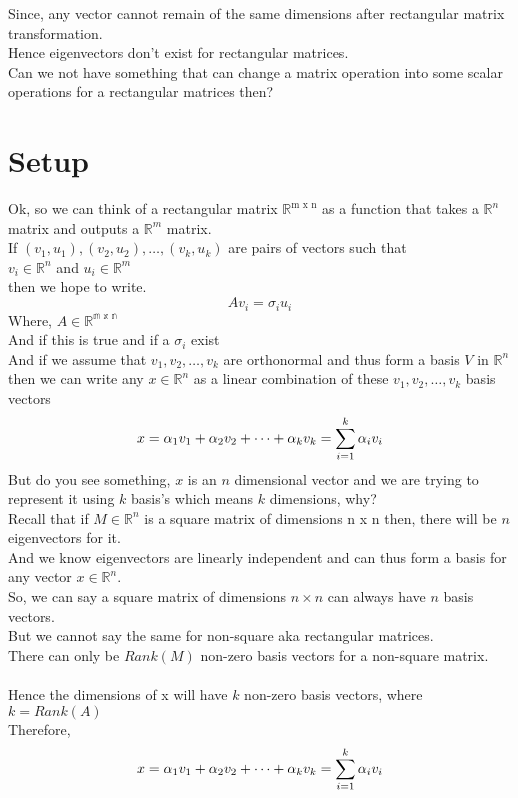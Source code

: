 \documentclass{article}
\begin{document}
Since, any vector cannot remain of the same dimensions after rectangular matrix transformation.\\
Hence eigenvectors don't exist for rectangular matrices.\\
Can we not have something that can change a matrix operation into some scalar operations for a rectangular matrices then?\\
\section{Setup}
Ok, so we can think of a rectangular matrix $\mathbb{R}^{\mbox{m x n}}$ as a function that takes a $\mathbb{R}^n$ matrix and outputs a $\mathbb{R}^m$ matrix.\\
If $(v_1,u_1),(v_2,u_2),\dots,(v_k,u_k)$ are pairs of vectors such that\\
$v_i\in \mathbb{R}^n$ and $u_i\in \mathbb{R}^m$\\ then we hope to write.\\
$$
  Av_i=\sigma_iu_i
$$
Where, $A \in \mathbb{R^{\mbox{m x n}}}$\\
And if this is true and if a $\sigma_i$ exist\\
And if we assume that $v_1,v_2,\dots,v_k$ are orthonormal and thus form a basis $V$ in $\mathbb{R}^n$ then we can write any $x\in\mathbb{R}^{n}$ as a linear combination of these $v_1,v_2,\dots,v_k$ basis vectors\\
$$
  x=\alpha_1v_1+\alpha_2v_2+\dots+\alpha_kv_k=\sum_{i=1}^{k}\alpha_iv_i\\
$$
But do you see something, $x$ is an $n$ dimensional vector and we are trying to represent it using $k$ basis's which means $k$ dimensions, why?\\
Recall that if $M\in \mathbb{R}^n$ is a square matrix of dimensions n x n then, there will be $n$ eigenvectors for it.\\
And we know eigenvectors are linearly independent and can thus form a basis for any vector $x\in \mathbb{R}^n$.\\
So, we can say a square matrix of dimensions $n\times n$ can always have $n$ basis vectors.\\
But we cannot say the same for non-square aka rectangular matrices.\\
There can only be $Rank(M)$ non-zero basis vectors for a non-square matrix.\\\\
Hence the dimensions of x will have $k$ non-zero basis vectors, where $k=Rank(A)$\\
Therefore,
$$
  x=\alpha_1v_1+\alpha_2v_2+\dots+\alpha_kv_k=\sum_{i=1}^{k}\alpha_iv_i\\
$$
\end{document}
